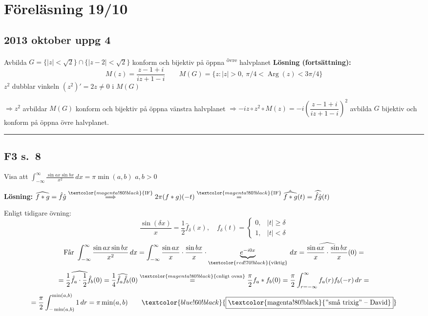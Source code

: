 \section{Föreläsning 19/10}
\subsection{2013 oktober uppg 4}
Avbilda $G = \{|z| < \sqrt{2}\} \cap \{|z - 2| < \sqrt{2}\}$ konform och bijektiv på öppna \textsuperscript{övre} halvplanet
\textbf{Lösning (fortsättning):}
\[ M(z) = \frac{z - 1 + i}{iz + 1 - i} \qquad M(G) = \{z : |z| > 0,\ \pi/4 < \operatorname{Arg}(z) < 3\pi/4\} \]
$z^2$ dubblar vinkeln \quad $(z^2)' = 2z \neq 0$ i $M(G)$

$\Rightarrow z^2$ avbildar $M(G)$ konform och bijektiv på öppna vänstra halvplanet
$\Rightarrow -iz \circ z^2 \circ M(z) = -i\left( \dfrac{z - 1 + i}{iz + 1 - i} \right)^2$ avbilda $G$ bijektiv och konform på öppna övre halvplanet.

\noindent\rule{\linewidth}{0.4pt}

\subsection{F3 s.\ 8}
Visa att $\displaystyle\int_{-\infty}^\infty \frac{\sin ax \sin bx}{x^2}\,dx = \pi \min(a, b)$ \quad $a, b > 0$

\textbf{Lösning:} $\widehat{f * g} = \hat{f}\hat{g} \overset{\textcolor{magenta!80!black}{\text{IF}}}{\Longrightarrow} 2\pi(f * g)(-t) \overset{\textcolor{magenta!80!black}{\text{IF}}}{=} \hat{\widehat{f * g}}(t) = \widehat{\hat{f}\hat{g}}(t)$

Enligt tidigare övning:
\[ \frac{\sin(\delta x)}{x} = \frac{1}{2}\hat{f}_\delta(x), \quad f_\delta(t) = \begin{cases} 0, & |t| \ge \delta \\ 1, & |t| < \delta \end{cases} \]
\[ \text{Får } \int_{-\infty}^\infty \frac{\sin ax \sin bx}{x^2}\,dx = \int_{-\infty}^\infty \frac{\sin ax}{x} \cdot \frac{\sin bx}{x} \cdot \underbrace{e^{-i0x}}_{\textcolor{red!70!black}{\text{viktig}}}\,dx = \widehat{\frac{\sin ax}{x} \cdot \frac{\sin bx}{x}}(0) = \]
\[ = \widehat{\frac{1}{2}\hat{f}_a \cdot \frac{1}{2}\hat{f}_b}(0) = \frac{1}{4}\widehat{\hat{f}_a \hat{f}_b}(0) \overset{\textcolor{magenta!80!black}{\text{enligt ovan}}}{=} \frac{\pi}{2} f_a * f_b(0) = \frac{\pi}{2} \int_{r = -\infty}^\infty f_a(r)f_b(-r)\,dr = \]
\[ = \frac{\pi}{2} \int_{-\min(a, b)}^{\min(a, b)} 1\,dr = \pi \min(a, b) \qquad \textcolor{blue!60!black}{\fbox{\textcolor{magenta!80!black}{''små trixig'' -- David}}} \]
